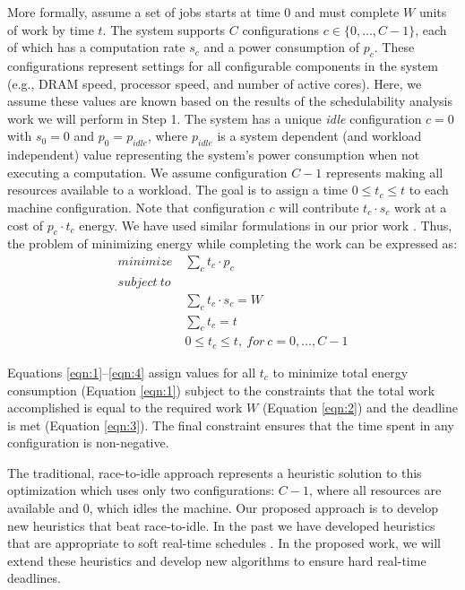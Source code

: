 More formally, assume a set of jobs starts at time $0$ and must
complete $W$ units of work by time $t$. The system supports $C$
configurations $c \in \{0,\dots,C-1\}$, each of which has a
computation rate $s_c$ and a power consumption of $p_c$. These
configurations represent settings for all configurable components in
the system (e.g., DRAM speed, processor speed, and number of active
cores).  Here, we assume these values are known based on the results
of the schedulability analysis work we will perform in Step 1. The
system has a unique \emph{idle} configuration $c = 0$ with $s_0 = 0$
and $p_0 = p_{idle}$, where $p_{idle}$ is a system dependent (and
workload independent) value representing the system's power
consumption when not executing a computation. We assume configuration
$C-1$ represents making all resources available to a workload.  The
goal is to assign a time $0 \le t_c \le t$ to each machine
configuration.  Note that configuration $c$ will contribute $t_c \cdot
s_c$ work at a cost of $p_c \cdot t_c$ energy.  We have used similar
formulations in our prior work \cite{LEO,POET,kim-cpsna}. Thus, the
problem of minimizing energy while completing the work can be
expressed as:
\begin{align*}
minimize~& \sum_c t_c \cdot p_c \tag{1} \label{eqn:1}\\
subject~to~\\
& \sum_c t_c \cdot s_c = W \tag{2} \label{eqn:2}\\
& \sum_c t_c = t \tag{3} \label{eqn:3}\\
& 0 \le t_c \le t,~for~c = 0,\dots,C-1 \tag{4} \label{eqn:4}
\end{align*}

Equations \ref{eqn:1}--\ref{eqn:4} assign values for all $t_c$ to
minimize total energy consumption (Equation \ref{eqn:1}) subject to the
constraints that the total work accomplished is equal to the required
work $W$ (Equation \ref{eqn:2}) and the deadline is met (Equation
\ref{eqn:3}). The final constraint ensures that the time spent in any
configuration is non-negative.

The traditional, race-to-idle approach represents a heuristic solution
to this optimization which uses only two configurations: $C-1$, where
all resources are available and $0$, which idles the machine.  Our
proposed approach is to develop new heuristics that beat race-to-idle.
In the past we have developed heuristics that are appropriate to soft
real-time schedules \cite{POET,PTRADE}.  In the proposed work, we will
extend these heuristics and develop new algorithms to ensure hard
real-time deadlines.  

